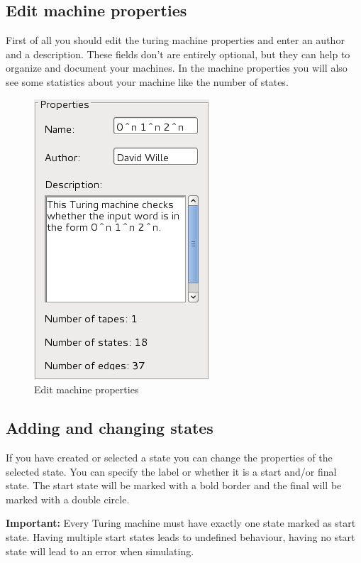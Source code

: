 \documentclass[%
  a4paper,%
  11pt,%
  blue,%
  hyperref	%
  ]{tubsartcl}
\begin{document}
\clearpage

\subsection{Edit machine properties}
\label{sec:edit-mach-prop}
First of all you should edit the turing machine properties and enter an author and a description. These fields don't are entirely optional, but they can help to organize and document your machines. In the machine properties you will also see some statistics about your machine like the number of states.
\begin{figure}[!htb]
\begin{center}
\includegraphics[scale=0.5]{graphics_gui/machine_properties.png}
\end{center}
\caption{Edit machine properties}
\label{pic:machine_properties}
\end{figure}

\subsection{Adding and changing states}
\label{sec:add-edit-states}
If you have created or selected a state you can change the properties of the selected state. You can specify the label or whether it is a start and/or final state. The start state will be marked with a bold border and the final will be marked with a double circle.

\textbf{Important:} Every Turing machine must have exactly one state marked as start state. Having multiple start states leads to undefined behaviour, having no start state will lead to an error when simulating.
\end{document}
